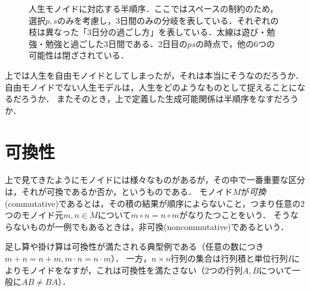 \documentclass[11pt,a4paper, dvipdfmx]{jsarticle}
\begin{document}
\begin{figure}[h]
    \centering
      \caption{人生モノイドに対応する半順序．ここではスペースの制約のため，選択$p, s$のみを考慮し，3日間のみの分岐を表している．それぞれの枝は異なった「3日分の過ごし方」を表している．太線は遊び・勉強・勉強と過ごした3日間である．2日目の$ps$の時点で，他の6つの可能性は閉ざされている．}
      \label{fig:monoid_tree}
\end{figure}

\begin{renshu}{}{}
    上では人生を自由モノイドとしてしまったが，それは本当にそうなのだろうか．
    自由モノイドでない人生モデルは，人生をどのようなものとして捉えることになるだろうか．
    またそのとき，上で定義した生成可能関係は半順序をなすだろうか．
\end{renshu}    


\section{可換性}
上で見てきたようにモノイドには様々なものがあるが，その中で一番重要な区分は，それが可換であるか否か，というものである．
モノイド$M$が\emph{可換}(commutative)であるとは，その積の結果が順序によらないこと，つまり任意の2つのモノイド元$m,n \in M$について$m \circ n = n \circ m$がなりたつことをいう．
そうならないものが一例でもあるときは，非可換(noncommutative)であるという．

\begin{rei}{}{}
    足し算や掛け算は可換性が満たされる典型例である（任意の数につき$m+n = n+m, m\cdot n = n\cdot m$）．
    一方，$n \times n$行列の集合は行列積と単位行列$I$によりモノイドをなすが，これは可換性を満たさない（2つの行列$A, B$について一般に$AB \neq BA$）．
\end{rei}
\end{document}
